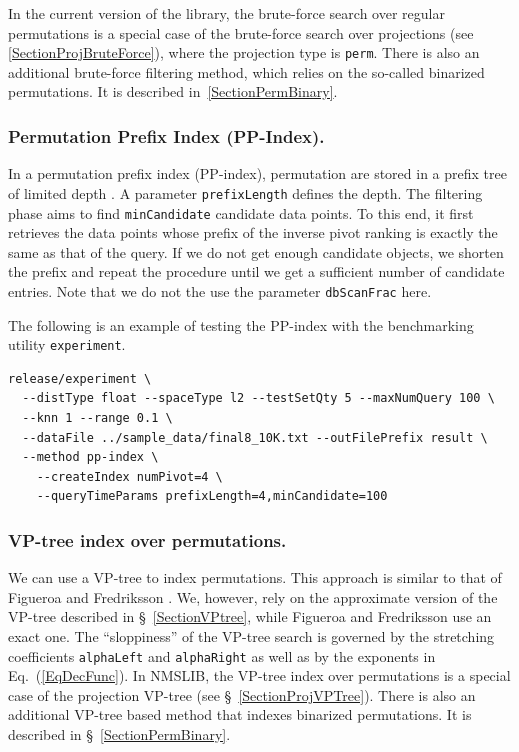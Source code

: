 \documentclass[runningheads,a4paper]{llncs}
\newcommand{\ttt}[1]{\texttt{#1}}
\begin{document}
{In the current version of the library, the brute-force search over
regular permutations is a special case of the brute-force search
over projections (see \ref{SectionProjBruteForce}), where the projection type is \ttt{perm}. 
There is also an additional brute-force filtering method, which relies on the so-called binarized permutations.
It is described in~\ref{SectionPermBinary}.

\subsubsection{Permutation Prefix Index  (PP-Index).}
In a permutation prefix index (PP-index),
 permutation are stored in a prefix tree 
of limited depth \cite{Esuli:2012}. A parameter \ttt{prefixLength}
defines the depth.
The filtering phase aims to find \ttt{minCandidate} candidate data points.
To this end, it first retrieves the data points whose prefix of the inverse pivot ranking is exactly the same
as that of the query. If we do not get enough candidate objects, we shorten the prefix
and repeat the procedure until we get a sufficient number of candidate entries.
Note that we do not the use the parameter \ttt{dbScanFrac} here.

\newpage
The following is an example of testing the PP-index with the benchmarking utility \ttt{experiment}.
{
\footnotesize
\begin{verbatim}
release/experiment \
  --distType float --spaceType l2 --testSetQty 5 --maxNumQuery 100 \
  --knn 1 --range 0.1 \
  --dataFile ../sample_data/final8_10K.txt --outFilePrefix result \
  --method pp-index \
    --createIndex numPivot=4 \
    --queryTimeParams prefixLength=4,minCandidate=100
\end{verbatim}
}

\subsubsection{VP-tree index over permutations.}
We can use a VP-tree to index permutations.
This approach is similar to that of Figueroa and Fredriksson \cite{figueroa2009speeding}. 
We, however, rely on the approximate version of the VP-tree described in \S~\ref{SectionVPtree},
while Figueroa and Fredriksson use an exact one.
The ``sloppiness'' of the VP-tree search is governed by the stretching coefficients 
 \ttt{alphaLeft}   and \ttt{alphaRight} as well as by the exponents in Eq.~(\ref{EqDecFunc}).
In NMSLIB, the VP-tree index over permutations is a special
case of the projection VP-tree (see \S~\ref{SectionProjVPTree}).
There is also an additional VP-tree based method that indexes binarized permutations.
It is described in \S~\ref{SectionPermBinary}.

}
\end{document}

